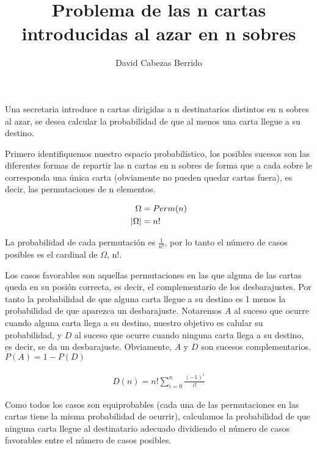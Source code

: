 \documentclass[12pt,spanish]{article}
\title{Problema de las n cartas introducidas al azar en n sobres}
\author{David Cabezas Berrido}
\date{}
\theoremstyle{definition}
\theoremstyle{remark}
\begin{document}
\maketitle

\begin{justify}
  Una secretaria introduce n cartas dirigidas a n destinatarios
  distintos en n sobres al azar, se desea calcular la probabilidad de
  que al menos una carta llegue a su destino.
\end{justify}

\begin{justify}
  Primero identifiquemos nuestro espacio probabilístico, los posibles
  sucesos son las diferentes formas de repartir las n cartas en n
  sobres de forma que a cada sobre le corresponda una única carta
  (obviamente no pueden quedar cartas fuera), es decir, las
  permutaciones de n elementos.
\end{justify}

\begin{align*}
  \Omega&=\mathnormal{Perm}(n)\\
  |\Omega|&=n!
 \end{align*}
    
\begin{justify}
  La probabilidad de cada permutación es $\frac{1}{n!}$, por lo tanto
  el número de casos posibles es el cardinal de $\Omega$, n!.
\end{justify}

\begin{justify}
  Los casos favorables son aquellas permutaciones en las que alguna de
  las cartas queda en su posión correcta, es decir, el complementario
  de los desbarajustes. Por tanto la probabilidad de que alguna carta
  llegue a su destino es 1 menos la probabilidad de que aparezca un
  desbarajuste. Notaremos $A$ al suceso que ocurre cuando alguna carta
  llega a su destino, nuestro objetivo es calular su probabilidad, y
  $D$ al suceso que ocurre cuando ninguna carta llega a su destino, es
  decir, se da un desbarajuste. Obviamente, $A$ y $D$ son sucesos
  complementarios.
  $P(A)=1-P(D)$
\end{justify}

\begin{align*}
  D(n)=n!\sum\limits_{i=0}^n\frac{(-1)^i}{i!}
\end{align*}

\begin{justify}
  Como todos los casos son equiprobables (cada una de las
  permutaciones en las cartas tiene la misma probabilidad de ocurrir),
  calculamos la probabilidad de que ninguna carta llegue al
  destinatario adecuado dividiendo el número de casos favorables entre
  el número de casos posibles.
\end{justify}
\end{document}
